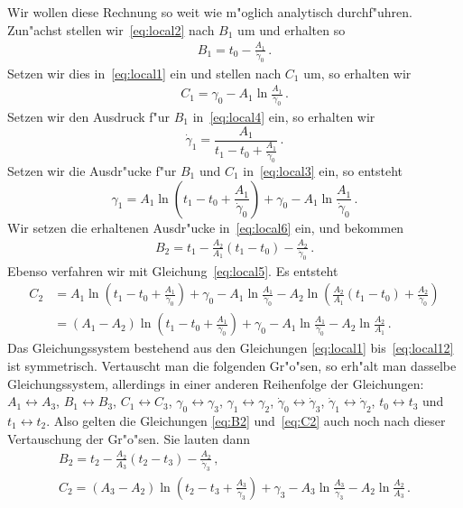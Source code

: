 \documentclass[a4paper]{scrartcl}
\begin{document}
Wir wollen diese Rechnung so weit wie m"oglich analytisch durchf"uhren. 
Zun"achst stellen wir~\eqref{eq:local2} nach $B_1$ um und erhalten so 
\begin{align} \label{eq:B1}
  B_1=t_0-\frac{A_1}{\dot\gamma_0}\,.
\end{align}
Setzen wir dies in~\eqref{eq:local1} ein und stellen nach $C_1$ um, so erhalten wir
\begin{align} \label{eq:C1}
  C_1=\gamma_0-A_1\ln\frac{A_1}{\dot\gamma_0}\,.
\end{align}
Setzen wir den Ausdruck f"ur $B_1$ in~\eqref{eq:local4} ein, so erhalten wir 
$$ \dot\gamma_1 = \frac{A_1}{t_1-t_0+\frac{A_1}{\dot\gamma_0}}\,. $$
Setzen wir die Ausdr"ucke f"ur $B_1$ und $C_1$ in~\eqref{eq:local3} ein, so entsteht
$$ \gamma_1 = A_1\ln\left(t_1-t_0+\frac{A_1}{\dot\gamma_0}\right)+\gamma_0-A_1\ln\frac{A_1}{\dot\gamma_0}\,. $$
Wir setzen die erhaltenen Ausdr"ucke in~\eqref{eq:local6} ein, und bekommen
\begin{align} \label{eq:B2}
  B_2 = t_1-\frac{A_2}{A_1}(t_1-t_0)-\frac{A_2}{\dot\gamma_0}\,.
\end{align}
Ebenso verfahren wir mit Gleichung~\eqref{eq:local5}. Es entsteht
\begin{equation} \label{eq:C2}
\begin{split}
  C_2 
  &= A_1\ln\left(t_1-t_0+\frac{A_1}{\dot\gamma_0}\right)+\gamma_0-A_1\ln\frac{A_1}{\dot\gamma_0}-A_2\ln\left(\frac{A_2}{A_1}(t_1-t_0)+\frac{A_2}{\dot\gamma_0}\right) \\
  &= (A_1-A_2)\ln\left(t_1-t_0+\frac{A_1}{\dot\gamma_0}\right)+\gamma_0-A_1\ln\frac{A_1}{\dot\gamma_0}-A_2\ln\frac{A_2}{A_1}\,.
\end{split}
\end{equation}
Das Gleichungssystem bestehend aus den Gleichungen \eqref{eq:local1} bis~\eqref{eq:local12} ist symmetrisch. 
Vertauscht man die folgenden Gr"o"sen, so erh"alt man dasselbe Gleichungssystem, allerdings in einer anderen Reihenfolge der Gleichungen: $A_1\leftrightarrow A_3$, $B_1\leftrightarrow B_3$, $C_1\leftrightarrow C_3$, $\gamma_0\leftrightarrow \gamma_3$, $\gamma_1\leftrightarrow \gamma_2$, $\dot\gamma_0\leftrightarrow \dot\gamma_3$, $\dot\gamma_1\leftrightarrow \dot\gamma_2$, $t_0\leftrightarrow t_3$ und $t_1\leftrightarrow t_2$. 
Also gelten die Gleichungen \eqref{eq:B2} und~\eqref{eq:C2} auch noch nach dieser Vertauschung der Gr"o"sen. 
Sie lauten dann 
\begin{gather}
  \label{eq:B2symm}
  B_2 = t_2-\frac{A_2}{A_3}(t_2-t_3)-\frac{A_2}{\dot\gamma_3}\,, \\
  \label{eq:C2symm}
  C_2 = (A_3-A_2)\ln\left(t_2-t_3+\frac{A_3}{\dot\gamma_3}\right)+\gamma_3-A_3\ln\frac{A_3}{\dot\gamma_3}-A_2\ln\frac{A_2}{A_3}\,.
\end{gather}
\end{document}
